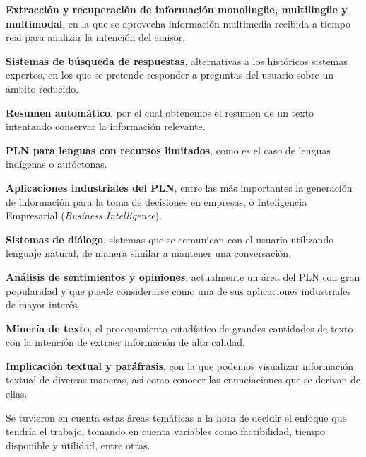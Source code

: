 \textbf{Extracción y recuperación de información monolingüe, multilingüe y multimodal}, en la que se aprovecha información multimedia recibida a tiempo real para analizar la intención del emisor.

\textbf{Sistemas de búsqueda de respuestas}, alternativas a los históricos sistemas expertos, en los que se pretende responder a preguntas del usuario sobre un ámbito reducido.


\textbf{Resumen automático}, por el cual obtenemos el resumen de un texto intentando conservar la información relevante.


\textbf{PLN para lenguas con recursos limitados}, como es el caso de lenguas indígenas o autóctonas.

\textbf{Aplicaciones industriales del PLN}, entre las más importantes la generación de información para la toma de decisiones en empresas, o Inteligencia Empresarial (\textit{Business Intelligence}).

\textbf{Sistemas de diálogo}, sistemas que se comunican con el usuario utilizando lenguaje natural, de manera similar a mantener una conversación. 

\textbf{Análisis de sentimientos y opiniones}, actualmente un área del PLN con gran popularidad y que puede considerarse como una de sus aplicaciones industriales de mayor interés.

\textbf{Minería de texto}, el procesamiento estadístico de grandes cantidades de texto con la intención de extraer información de alta calidad.


\textbf{Implicación textual y paráfrasis}, con la que podemos visualizar información textual de diversas maneras, así como conocer las enunciaciones que se derivan de ellas.

Se tuvieron en cuenta estas áreas temáticas a la hora de decidir el enfoque que tendría el trabajo, tomando en cuenta variables como factibilidad, tiempo disponible y utilidad, entre otras.

